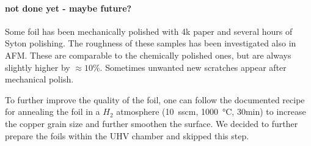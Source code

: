   	\paragraph{not done yet - maybe future?}
  Some foil has been mechanically polished with 4k paper and several hours of Syton polishing. The roughness of these samples has been investigated also in AFM. These are comparable to the chemically polished ones, but are always slightly higher by $\approx 10\%$. Sometimes unwanted new scratches appear after mechanical polish.
  
  To further improve the quality of the foil, one can follow the documented recipe for annealing the foil in a $H_2$ atmosphere (\SI{10}{sscm}, \SI{1000}{\celsius}, 30min)\cite{kim_synthesis_2012} to increase the copper grain size and further smoothen the surface. We decided to further prepare the foils within the UHV chamber and skipped this step.